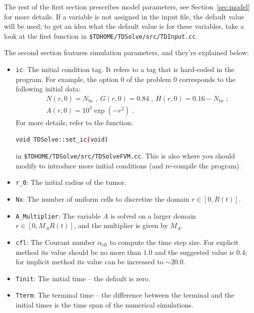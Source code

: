 \documentclass{amsproc}
\theoremstyle{definition}
\theoremstyle{remark}
\numberwithin{equation}{section}
\numberwithin{figure}{section}
\begin{document}
The rest of the first section prescribes model parameters, see Section~\ref{sec:model} for more details.
If a variable is not assigned in the input file, the default value will be used; to get an idea what the default value is for these variables, take a look at the first function in \texttt{\$TDHOME/TDSolve/src/TDInput.cc}.

The second section features simulation parameters, and they're explained below:
\begin{itemize}
\item \texttt{ic}: The initial condition tag. 
It refers to a tag that is hard-coded in the program. 
For example, the option 0 of the problem 0 corresponds to the following initial data:
\begin{align*}
&N(r,0) = N_{\textrm{bc}}\;,\ G(r,0) = 0.84\;,\ H(r,0) = 0.16-N_{\textrm{bc}}\;; \\
&A(r,0) = 10^3\exp(-r^2)\;.
\end{align*}
For more details, refer to the function:
\begin{lstlisting}[backgroundcolor = \color{lightgray}, language = bash, xleftmargin = 0.1cm, framexleftmargin = 0.1cm]
void TDSolve::set_ic(void)
\end{lstlisting}
in \texttt{\$TDHOME/TDSolve/src/TDSolveFVM.cc}.
This is also where you should modify to introduce more initial conditions (and re-compile the program).
\item \texttt{r\_0}: The initial radius of the tumor.
\item \texttt{Nx}: The number of uniform cells to discretize the domain $r\in[0, R(t)]$.
\item \texttt{A\_Multiplier}: The variable $A$ is solved on a larger domain $r\in[0, M_AR(t)]$, and the multiplier is given by $M_A$.
\item \texttt{cfl}: The Courant number $\alpha_{\textrm{cfl}}$ to compute the time step size. For explicit method its value should be no more than $1.0$ and the suggested value is $0.4$; for implicit method its value can be increased to $\sim 20.0$.
\item \texttt{Tinit}: The initial time -- the default is zero.
\item \texttt{Tterm}: The terminal time -- the difference between the terminal and the initial times is the time span of the numerical simulations.

\end{itemize}
\end{document}
